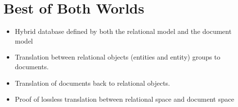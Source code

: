 \chapter{Best of Both Worlds}

\begin{itemize}
	\item Hybrid database defined by both the relational model and the document model
	\item Translation between relational objects (entities and entity) groups to documents.
	\item Translation of documents back to relational objects.
	\item Proof of lossless translation between relational space and document space
\end{itemize}
